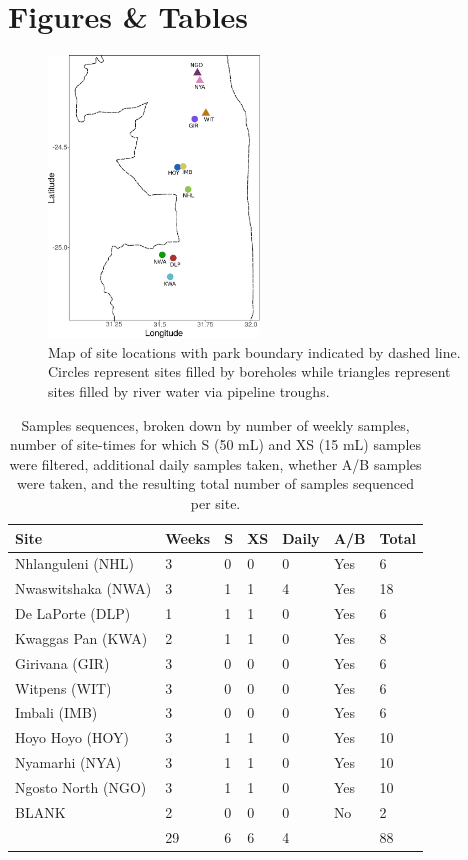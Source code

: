 \newpage
\section*{Figures \& Tables}

\begin{figure}[!ht]
  \centering
    \includegraphics[width=0.5\textwidth]{plots_tables/chap_1/kruger_points_simple.pdf}
  \caption{Map of site locations with park boundary indicated by dashed line. Circles represent sites filled by boreholes while triangles represent sites filled by river water via pipeline troughs.}
  \label{fig:map}
\end{figure}

\begin{table}[h!]
\centering
\begin{tabular}{llllll|l}
  \hline
  \hline
  Site & Weeks & S & XS & Daily & A/B & Total\\
  \hline
  Nhlanguleni (NHL) 	& 3 & 0 & 0 & 0 & Yes & 6 \\ 
  Nwaswitshaka (NWA) 	& 3 & 1 & 1 & 4 & Yes & 18 \\ 
  De LaPorte (DLP) 		& 1 & 1 & 1 & 0 & Yes & 6 \\ 
  Kwaggas Pan (KWA) 	& 2 & 1 & 1 & 0 & Yes & 8\\ 
  Girivana (GIR) 		& 3 & 0 & 0 & 0 & Yes & 6 \\ 
  Witpens (WIT) 		& 3 & 0 & 0 & 0 & Yes & 6 \\ 
  Imbali (IMB) 			& 3 & 0 & 0 & 0 & Yes & 6 \\ 
  Hoyo Hoyo (HOY) 		& 3 & 1 & 1 & 0 & Yes & 10 \\ 
  Nyamarhi (NYA) 		& 3 & 1 & 1 & 0 & Yes & 10 \\ 
  Ngosto North (NGO) 	& 3 & 1 & 1 & 0 & Yes &10 \\ 
  BLANK 				& 2 & 0 & 0 & 0 & No & 2 \\ 
  \hline
   						& 29 & 6 & 6 & 4 & & 88 \\
  \hline
  \hline
\end{tabular}
\caption{Samples sequences, broken down by number of weekly samples, number of site-times for which S (50 mL) and XS (15 mL) samples were filtered, additional daily samples taken, whether A/B samples were taken, and the resulting total number of samples sequenced per site.}
\label{tab:samples}
\end{table}
